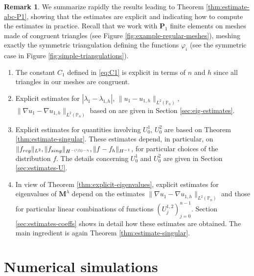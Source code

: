 \documentclass[11pt]{article}
\numberwithin{equation}{section}\newtheorem*{jepEnonce}{\jepEnonceTitle}\newenvironment{enonce*}[1]{\def\jepEnonceTitle{#1}\jepEnonce}{\endjepEnonce}\newtheorem*{conj*}{Conjecture}
\newcommand{\Psfrac}[2]{(\sfrac{#1}{#2})}
\theoremstyle{plain}
\theoremstyle{definition}
\newtheorem{rem}[thm]{Remark}
\newcommand{\bo}[1]{{\boldsymbol#1}}
\newcommand{\reg}{\textup{reg}}
\newcommand{\sing}{\textup{sing}}
\def\Pp{{\mathbb{P}_n}}
\let\jepOriginalSfrac\sfrac
\renewcommand{\sfrac}[2]{{\jepOriginalSfrac{#1}{#2}}}
\begin{document}
\begin{rem}
We summarize rapidly the results leading to Theorem \ref{thm:estimate-abc-P1}, showing that the estimates are explicit and indicating how to compute the estimates in practice. Recall that we work with $\bo P_1$ finite elements on meshes made of congruent triangles (see Figure \ref{fig:example-regular-meshes}), meshing exactly the symmetric triangulation defining the functions $\varphi_i$ (see the symmetric case in Figure \ref{fig:simple-triangulations}).

\begin{enumerate}
\item
The constant $C_1$ defined in \eqref{eq:C1} is explicit in terms of $n$ and $h$ since all triangles in our meshes are congruent.

\item
Explicit estimates for $|\lambda_1-\lambda_{1,h}|$, $\|u_1-u_{1,h}\|_{L^2(\Pp)}$, $\|\nabla u_1-\nabla u_{1,h}\|_{L^2(\Pp)}$ based on \cite{LiOi13} are given in Section \ref{sec:eig-estimates}.

\item
Explicit estimates for quantities involving $U_0^1$, $U_0^2$ are based on Theorem \ref{thm:estimate-singular}. These estimates depend, in particular, on $\|f_{\reg}\|_{L^2}, \|f_{\sing}\|_{H^{-\Psfrac{1}{2}-\gamma}}, \|f-f_h\|_{H^{-1}}$, for particular choices of the distribution $f$. The details concerning $U_0^1$ and $U_0^2$ are given in Section \ref{sec:estimates-U}.

\item
In view of Theorem \ref{thm:explicit-eigenvalues}, explicit estimates for eigenvalues of $\bo M^\lambda$ depend on the estimates $\|\nabla u_1-\nabla u_{1,h}\|_{L^2(\Pp)}$ and those for particular linear combinations of functions $(U_j^{1,2})_{j=0}^{n-1}$. Section \ref{sec:estimates-coeffs} shows in detail how these estimates are obtained. The main ingredient is again Theorem \ref{thm:estimate-singular}.
\end{enumerate}
\end{rem}

\section{Numerical simulations}\label{bobu200.s6}
\end{document}
